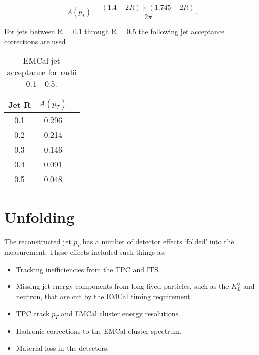 \begin{equation}
A(p_{T}) = \frac{(1.4 - 2R) \times (1.745 - 2R)}{2 \pi}.
\label{eq:acceptance}
\end{equation}

For jets between R = 0.1 through R = 0.5 the following jet acceptance corrections are used.

\begin{table}[hb]
\label{tab:AcceptanceFactor}
\begin{center}
\begin{tabular}[b]{|c|c|c|}
	\hline
	Jet R & $A(p_{T})$ \\ \hline
	0.1 & 0.296 \\ \hline
	0.2 & 0.214\\ \hline
	0.3 & 0.146\\ \hline
	0.4 & 0.091\\ \hline
	0.5 & 0.048\\ \hline
\end{tabular}
\end{center}
\caption{EMCal jet acceptance for radii 0.1 - 0.5.}
\end{table}



\section{Unfolding}

The reconstructed jet $p_{T}$ has a number of detector effects `folded' into the measurement.  These effects included such things as:

\begin{itemize}
\item Tracking inefficiencies from the TPC and ITS.
\item Missing jet energy components from long-lived particles, such as the $K^{0}_{L}$ and neutron, that are cut by the EMCal timing requirement.
\item TPC track $p_{T}$ and EMCal cluster energy resolutions.
\item Hadronic corrections to the EMCal cluster spectrum.
\item Material loss in the detectors.
\end{itemize}

